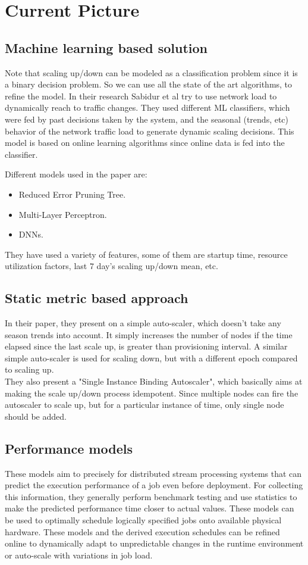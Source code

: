 \documentclass[11pt]{article}
\begin{document}
\section*{Current Picture}

\subsection*{Machine learning based solution \cite{mlsoln}}
Note that scaling up/down can be modeled as a classification problem since it 
is a binary decision problem. So we can use all the state of the art algorithms,
to refine the model. In their research Sabidur et al try to use network load to 
dynamically reach to traffic changes. They used different ML classifiers, which 
were fed by past decisions taken by the system, and the seasonal (trends, etc) behavior
of the network traffic load to generate dynamic scaling decisions. This model
is based on online learning algorithms since online data is fed into the classifier.

Different models used in the paper are:
\begin{itemize}
    \item Reduced Error Pruning Tree.
    \item Multi-Layer Perceptron.
    \item DNNs.
\end{itemize}
They have used a variety of features, some of them are startup time, resource utilization factors,
last $7$ day's scaling up/down mean, etc.

\subsection*{Static metric based approach \cite{simplesoln}}
In their paper, they present on a simple auto-scaler, which doesn't take any season trends into account.
It simply increases the number of nodes if the time elapsed since the last scale up, is greater than 
provisioning interval. A similar simple auto-scaler is used for scaling down, but with a different epoch
compared to scaling up.\\

They also present a "Single Instance Binding Autoscaler", which basically aims at making the scale up/down
process idempotent. Since multiple nodes can fire the autoscaler to scale up, but for a particular instance of time,
only single node should be added.

\subsection*{Performance models \cite{models}}
These models aim to precisely for
distributed stream processing systems that can predict the
execution performance of a job even before deployment. For collecting this information, they
generally perform benchmark testing and use statistics to make the predicted performance time
closer to actual values. These models can be used to optimally schedule logically specified
jobs onto available physical hardware. These models and the derived execution schedules can be refined
online to dynamically adapt to unpredictable changes in the
runtime environment or auto-scale with variations in job load.
\end{document}
